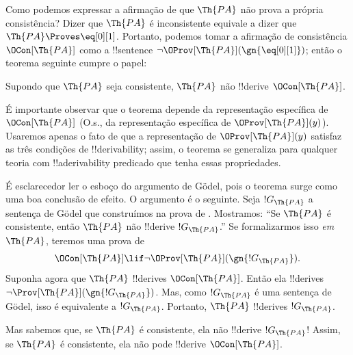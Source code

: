 \documentclass[../../../include/open-logic-section]{subfiles}
\begin{document}


Como podemos expressar a afirmação de que $\Th{PA}$ não prova a própria
consistência? Dizer que $\Th{PA}$ é inconsistente equivale a dizer que
$\Th{PA} \Proves \eq[0][1]$. Portanto, podemos tomar a afirmação de
consistência $\OCon[\Th{PA}]$ como a !!{sentence} $\lnot
\OProv[\Th{PA}](\gn{\eq[0][1]})$; então o teorema seguinte cumpre o papel:

\begin{thm}
Supondo que $\Th{PA}$ seja consistente, $\Th{PA}$ não !!{derive}
$\OCon[\Th{PA}]$.
\end{thm}

É importante observar que o teorema depende da representação específica de
$\OCon[\Th{PA}]$ (O.s.\@, da representação específica de
$\OProv[\Th{PA}](y)$). Usaremos apenas o fato de que a representação de
$\OProv[\Th{PA}](y)$ satisfaz as três condições de !!{derivability}; assim,
o teorema se generaliza para qualquer teoria com !!a{derivability}
predicado que tenha essas propriedades.

É esclarecedor ler o esboço do argumento de G\"odel, pois o teorema surge
como uma boa conclusão de efeito. O argumento é o seguinte. Seja
$!G_\Th{PA}$ a sentença de G\"odel que construímos na prova de
. Mostramos: ``Se $\Th{PA}$ é
consistente, então $\Th{PA}$ não !!{derive} $!G_\Th{PA}$.'' Se
formalizarmos isso \emph{em} $\Th{PA}$, teremos uma prova de
\[
\OCon[\Th{PA}] \lif \lnot \OProv[\Th{PA}](\gn{!G_\Th{PA}}).
\]
Suponha agora que $\Th{PA}$ !!{derive}s $\OCon[\Th{PA}]$. Então ela
!!{derive}s $\lnot \Prov[\Th{PA}](\gn{!G_\Th{PA}})$. Mas, como
$!G_\Th{PA}$ é uma sentença de G\"odel, isso é equivalente a
$!G_\Th{PA}$. Portanto, $\Th{PA}$ !!{derive}s $!G_\Th{PA}$.

Mas sabemos que, se $\Th{PA}$ é consistente, ela não !!{derive}
$!G_\Th{PA}$!{} Assim, se $\Th{PA}$ é consistente, ela não pode !!{derive}
$\OCon[\Th{PA}]$.
\end{document}
